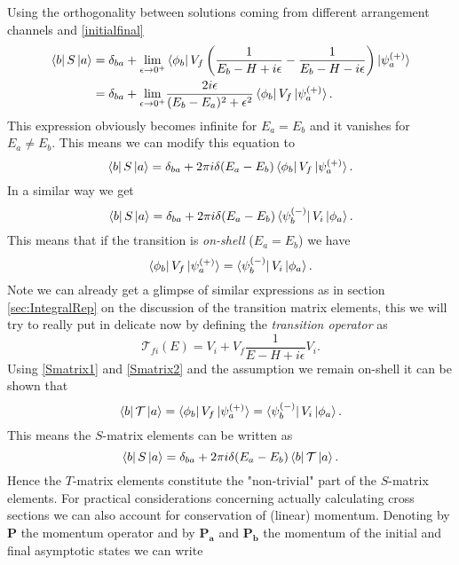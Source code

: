 \documentclass[11pt]{article}
\numberwithin{equation}{section}
\begin{document}
Using the orthogonality between solutions coming from different arrangement channels and \eqref{initialfinal}
\begin{align}
\begin{split}
	\bra{b} S \ket{a} &= \delta_{ba} + \underset{\epsilon \rightarrow 0^+}\lim \bra{\phi_b} V_f \left(\frac{1}{E_b - H + i\epsilon} -  \frac{1}{E_b - H - i\epsilon}\right) \ket{\psi^{(+)}_a}\\
	&= \delta_{ba} + \underset{\epsilon \rightarrow 0^+}\lim \frac{2i\epsilon}{(E_b-E_a)^2 + \epsilon^2} \bra{\phi_b}V_f\ket{\psi^{(+)}_a}.
\end{split}
\end{align}
This expression obviously becomes infinite for $E_a = E_b$ and it vanishes for $E_a \neq E_b$. This means we can modify this equation to
\begin{equation}
	\bra{b} S \ket{a} = \delta_{ba} + 2\pi i \delta(E_a-E_b) \bra{\phi_b}V_f\ket{\psi^{(+)}_a}.
\end{equation}
In a similar way we get
\begin{equation}\label{Smatrix1}
	\bra{b} S \ket{a} = \delta_{ba} + 2\pi i \delta(E_a-E_b) \bra{\psi^{(-)}_b }V_i\ket{\phi_a}.
\end{equation}
This means that if the transition is \emph{on-shell} ($E_a = E_b$) we have
\begin{equation}\label{Smatrix2}
	\bra{\phi_b}V_f\ket{\psi^{(+)}_a} = \bra{\psi^{(-)}_b }V_i\ket{\phi_a}.
\end{equation}
Note we can already get a glimpse of similar expressions as in section \ref{sec:IntegralRep} on the discussion of the transition matrix elements, this we will try to really put in delicate now by defining the \emph{transition operator} as
\begin{equation}
	\mathcal{T}_{fi}(E) = V_i + V_f\frac{1}{E-H + i\epsilon}V_i.
\end{equation}
Using \eqref{Smatrix1} and \eqref{Smatrix2} and the assumption we remain on-shell it can be shown that
\begin{equation}
	\bra{b} \mathcal{T} \ket{a} = \bra{\phi_b}V_f\ket{\psi^{(+)}_a} = \bra{\psi^{(-)}_b }V_i\ket{\phi_a}.
\end{equation}
This means the $S$-matrix elements can be written as
\begin{equation}
	\bra{b} S \ket{a} = \delta_{ba} + 2\pi i \delta(E_a-E_b)\bra{b} \mathcal{T} \ket{a} .
\end{equation}
Hence the $T$-matrix elements constitute the "non-trivial" part of the $S$-matrix elements. For practical considerations concerning actually calculating cross sections we can also account for conservation of (linear) momentum. Denoting by $\boldsymbol{P}$ the momentum operator and by $\boldsymbol{P_a}$ and $\boldsymbol{P_b}$ the momentum of the initial and final asymptotic states we can write
\end{document}
